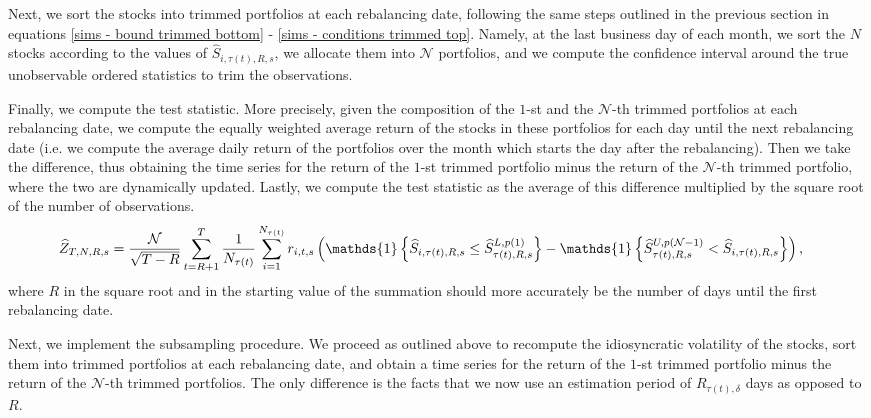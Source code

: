 Next, we sort the stocks into trimmed portfolios at each rebalancing date, following the same steps outlined in the previous section in equations \eqref{sims - bound trimmed bottom} - \eqref{sims - conditions trimmed top}. Namely, at the last business day of each month, we sort the $N$ stocks according to the values of $\widehat{S}_{i,\tau(t),R,s}$, we allocate them into $\mathcal{N}$ portfolios, and we compute the confidence interval around the true unobservable ordered statistics to trim the observations. 

Finally, we compute the test statistic. More precisely, given the composition of the $1$-st and the $\mathcal{N}$-th trimmed portfolios at each rebalancing date, we compute the equally weighted average return of the stocks in these portfolios for each day until the next rebalancing date (i.e. we compute the average daily return of the portfolios over the month which starts the day after the rebalancing). Then we take the difference, thus obtaining the time series for the return of the $1$-st trimmed portfolio minus the return of the $\mathcal{N}$-th trimmed portfolio, where the two are dynamically updated. Lastly, we compute the test statistic as the average of this difference multiplied by the square root of the number of observations.  
\begin{align*}
    \widehat{Z}_{T,N,R,s} &=\frac{\mathcal{N}}{\sqrt{T-R}}\sum_{t=R+1}^{T}\frac{1}{N_{\tau(t)}}\sum_{i=1}^{N_{\tau(t)}}r_{i,t,s}\left( \mathds{1} \left\{ \widehat{S}_{i,\tau(t),R,s}\leq \widehat{S}_{\tau(t),R,s}^{L, p(1)} \right\} - \mathds{1}\left\{  \widehat{S}_{\tau(t),R,s}^{U, p(\mathcal{N}-1)} < \widehat{S}_{i,\tau(t),R,s}\right\} \right), \notag
\end{align*}
where $R$ in the square root and in the starting value of the summation should more accurately be the number of days until the first rebalancing date.

Next, we implement the subsampling procedure. We proceed as outlined above to recompute the idiosyncratic volatility of the stocks, sort them into trimmed portfolios at each rebalancing date, and obtain a time series for the return of the $1$-st trimmed portfolio minus the return of the $\mathcal{N}$-th trimmed portfolios. The only difference is the facts that we now use an estimation period of $R_{\tau(t), \delta}$ days as opposed to $R$. 

